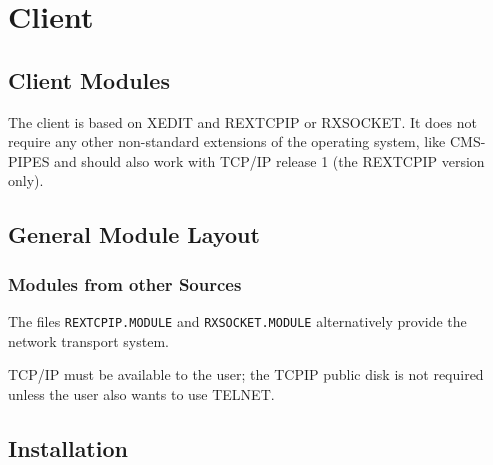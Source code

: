 \section{Client}




\subsection{Client Modules}

The client is based on {\sf XEDIT} and {\sf REXTCPIP} or {\sf RXSOCKET}.
It does not
require any other non-standard extensions of the operating system, like
{\sf CMS-PIPES} and should also work with TCP/IP release 1 (the
REXTCPIP version only).




\subsection{General Module Layout}

 


\subsubsection{Modules from other Sources}
 
The files {\tt REXTCPIP.MODULE} and {\tt RXSOCKET.MODULE}
alternatively provide the network transport system.
 
TCP/IP must be available to the user; the TCPIP public disk is not
required unless the user also wants to use TELNET.
 
 


\subsection{Installation}



